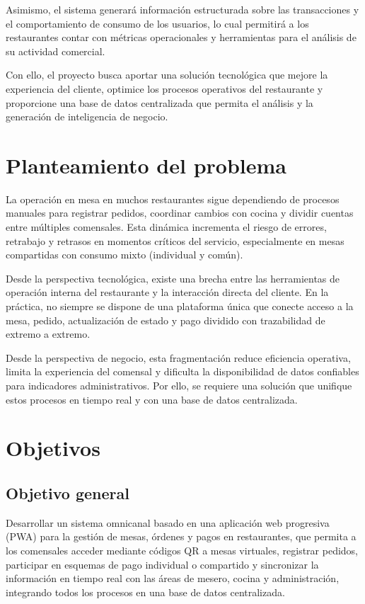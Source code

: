 \documentclass[12pt]{report}
\begin{document}
Asimismo, el sistema generará información estructurada sobre las transacciones y el comportamiento de consumo de los usuarios, lo cual permitirá a los restaurantes contar con métricas operacionales y herramientas para el análisis de su actividad comercial.

Con ello, el proyecto busca aportar una solución tecnológica que mejore la experiencia del cliente, optimice los procesos operativos del restaurante y proporcione una base de datos centralizada que permita el análisis y la generación de inteligencia de negocio.

\section{Planteamiento del problema}
La operación en mesa en muchos restaurantes sigue dependiendo de procesos manuales para registrar pedidos, coordinar cambios con cocina y dividir cuentas entre múltiples comensales. Esta dinámica incrementa el riesgo de errores, retrabajo y retrasos en momentos críticos del servicio, especialmente en mesas compartidas con consumo mixto (individual y común).

Desde la perspectiva tecnológica, existe una brecha entre las herramientas de operación interna del restaurante y la interacción directa del cliente. En la práctica, no siempre se dispone de una plataforma única que conecte acceso a la mesa, pedido, actualización de estado y pago dividido con trazabilidad de extremo a extremo.

Desde la perspectiva de negocio, esta fragmentación reduce eficiencia operativa, limita la experiencia del comensal y dificulta la disponibilidad de datos confiables para indicadores administrativos. Por ello, se requiere una solución que unifique estos procesos en tiempo real y con una base de datos centralizada.

\section{Objetivos}
\subsection{Objetivo general}
Desarrollar un sistema omnicanal basado en una aplicación web progresiva (PWA) para la gestión de mesas, órdenes y pagos en restaurantes, que permita a los comensales acceder mediante códigos QR a mesas virtuales, registrar pedidos, participar en esquemas de pago individual o compartido y sincronizar la información en tiempo real con las áreas de mesero, cocina y administración, integrando todos los procesos en una base de datos centralizada.
\end{document}
